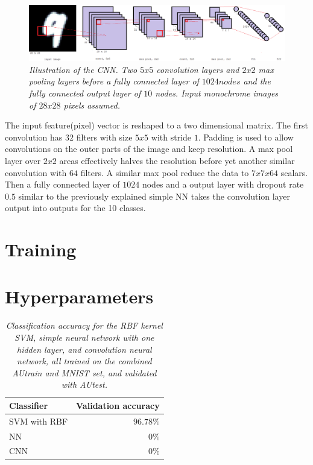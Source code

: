 \documentclass[a4paper,10pt,article,oneside,english]{memoir}
\let\oldcaption\caption
\renewcommand{\caption}[1]{\oldcaption{\emph{#1}}}
\begin{document}
	\begin{figure}[h!]
		\centering
		\includegraphics[width=1\linewidth]{cnn_layout.png}
		\caption{Illustration of the CNN. Two $5 x 5$ convolution layers and $2 x 2$ max pooling layers before a fully connected layer of $1024 nodes$ and the fully connected output layer of $10$ nodes. Input monochrome images of $28x28$ pixels assumed.}
		\label{fig:cnn_layout}
	\end{figure}
	
	The input feature(pixel) vector is reshaped to a two dimensional matrix. The first convolution has $32$ filters with size $5x5$ with stride $1$. Padding is used to allow convolutions on the outer parts of the image and keep resolution. A max pool layer over $2x2$ areas effectively halves the resolution before yet another similar convolution with $64$ filters. A similar max pool reduce the data to $7x7x64$ scalars. Then a fully connected layer of $1024$ nodes and a output layer with dropout rate $0.5$ similar to the previously explained simple NN takes the convolution layer output into outputs for the 10 classes.
	
	
	
	
	\section{Training}
	
	
	
	
	\section{Hyperparameters}
	
	
	\begin{table}[h!]
		\centering
		\caption{Classification accuracy for the RBF kernel SVM, simple neural network with one hidden layer, and convolution neural network, all trained on the combined AUtrain and MNIST set, and validated with AUtest. }
		\label{tab:classifier_accuracy}
		\begin{tabular}{lr}
			Classifier & Validation accuracy \\ 
			\hline 
			SVM with RBF & $96.78\%$ \\ 
			NN & $0\%$ \\ 
			CNN & $0\%$ \\ 
		\end{tabular} 
	\end{table}
	
	
	
	
\end{document}
